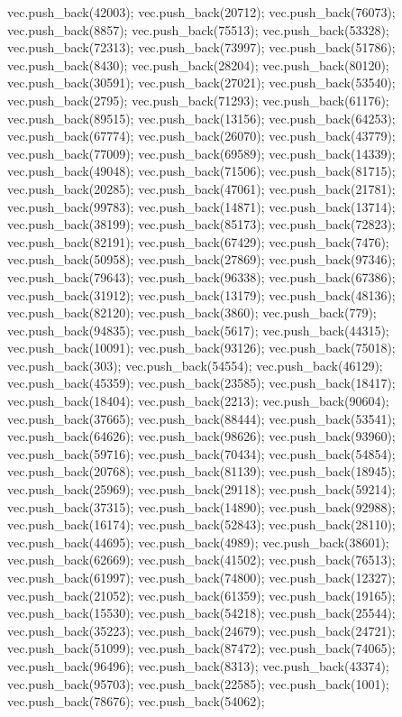 vec.push_back(42003);
vec.push_back(20712);
vec.push_back(76073);
vec.push_back(8857);
vec.push_back(75513);
vec.push_back(53328);
vec.push_back(72313);
vec.push_back(73997);
vec.push_back(51786);
vec.push_back(8430);
vec.push_back(28204);
vec.push_back(80120);
vec.push_back(30591);
vec.push_back(27021);
vec.push_back(53540);
vec.push_back(2795);
vec.push_back(71293);
vec.push_back(61176);
vec.push_back(89515);
vec.push_back(13156);
vec.push_back(64253);
vec.push_back(67774);
vec.push_back(26070);
vec.push_back(43779);
vec.push_back(77009);
vec.push_back(69589);
vec.push_back(14339);
vec.push_back(49048);
vec.push_back(71506);
vec.push_back(81715);
vec.push_back(20285);
vec.push_back(47061);
vec.push_back(21781);
vec.push_back(99783);
vec.push_back(14871);
vec.push_back(13714);
vec.push_back(38199);
vec.push_back(85173);
vec.push_back(72823);
vec.push_back(82191);
vec.push_back(67429);
vec.push_back(7476);
vec.push_back(50958);
vec.push_back(27869);
vec.push_back(97346);
vec.push_back(79643);
vec.push_back(96338);
vec.push_back(67386);
vec.push_back(31912);
vec.push_back(13179);
vec.push_back(48136);
vec.push_back(82120);
vec.push_back(3860);
vec.push_back(779);
vec.push_back(94835);
vec.push_back(5617);
vec.push_back(44315);
vec.push_back(10091);
vec.push_back(93126);
vec.push_back(75018);
vec.push_back(303);
vec.push_back(54554);
vec.push_back(46129);
vec.push_back(45359);
vec.push_back(23585);
vec.push_back(18417);
vec.push_back(18404);
vec.push_back(2213);
vec.push_back(90604);
vec.push_back(37665);
vec.push_back(88444);
vec.push_back(53541);
vec.push_back(64626);
vec.push_back(98626);
vec.push_back(93960);
vec.push_back(59716);
vec.push_back(70434);
vec.push_back(54854);
vec.push_back(20768);
vec.push_back(81139);
vec.push_back(18945);
vec.push_back(25969);
vec.push_back(29118);
vec.push_back(59214);
vec.push_back(37315);
vec.push_back(14890);
vec.push_back(92988);
vec.push_back(16174);
vec.push_back(52843);
vec.push_back(28110);
vec.push_back(44695);
vec.push_back(4989);
vec.push_back(38601);
vec.push_back(62669);
vec.push_back(41502);
vec.push_back(76513);
vec.push_back(61997);
vec.push_back(74800);
vec.push_back(12327);
vec.push_back(21052);
vec.push_back(61359);
vec.push_back(19165);
vec.push_back(15530);
vec.push_back(54218);
vec.push_back(25544);
vec.push_back(35223);
vec.push_back(24679);
vec.push_back(24721);
vec.push_back(51099);
vec.push_back(87472);
vec.push_back(74065);
vec.push_back(96496);
vec.push_back(8313);
vec.push_back(43374);
vec.push_back(95703);
vec.push_back(22585);
vec.push_back(1001);
vec.push_back(78676);
vec.push_back(54062);
